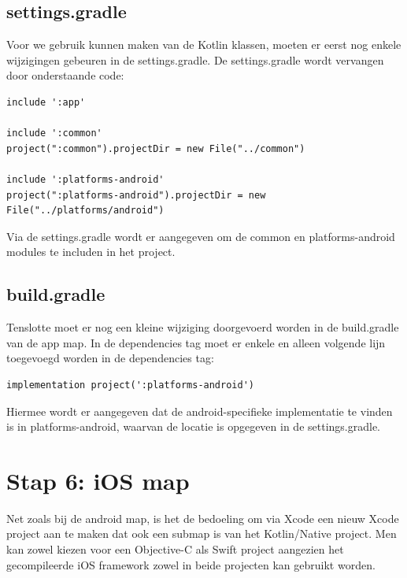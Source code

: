 \subsection{settings.gradle}
Voor we gebruik kunnen maken van de Kotlin klassen, moeten er eerst nog enkele wijzigingen gebeuren in de settings.gradle. De settings.gradle wordt vervangen door onderstaande code:

\begin{lstlisting}
include ':app'

include ':common'
project(":common").projectDir = new File("../common")

include ':platforms-android'
project(":platforms-android").projectDir = new File("../platforms/android")
\end{lstlisting}

Via de settings.gradle wordt er aangegeven om de common en platforms-android modules te includen in het project.

\subsection{build.gradle}
Tenslotte moet er nog een kleine wijziging doorgevoerd worden in de build.gradle van de app map. In de dependencies tag moet er enkele en alleen volgende lijn toegevoegd worden in de dependencies tag:

\begin{lstlisting}
implementation project(':platforms-android')
\end{lstlisting}

Hiermee wordt er aangegeven dat de android-specifieke implementatie te vinden is in platforms-android, waarvan de locatie is opgegeven in de settings.gradle. 

\section{Stap 6: iOS map}
Net zoals bij de android map, is het de bedoeling om via Xcode een nieuw Xcode project aan te maken dat ook een submap is van het Kotlin/Native project. Men kan zowel kiezen voor een Objective-C als Swift project aangezien het gecompileerde iOS framework zowel in beide projecten kan gebruikt worden.

